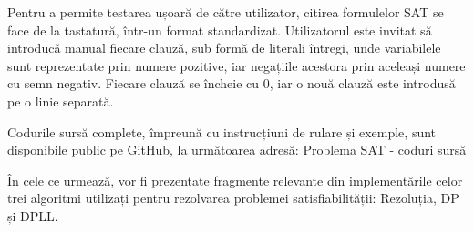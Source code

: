 \documentclass[12pt,a4paper]{article}
\begin{document}
Pentru a permite testarea ușoară de către utilizator, citirea formulelor SAT se face de la tastatură, într-un format standardizat. Utilizatorul este invitat să introducă manual fiecare clauză, sub formă de literali întregi, unde variabilele sunt reprezentate prin numere pozitive, iar negațiile acestora prin aceleași numere cu semn negativ. Fiecare clauză se încheie cu 0, iar o nouă clauză este introdusă pe o linie separată.

Codurile sursă complete, împreună cu instrucțiuni de rulare și exemple, sunt disponibile public pe GitHub, la următoarea adresă: \href{https://github.com/IsabellaNicorescu/SAT-solver}{Problema SAT - coduri sursă}


În cele ce urmează, vor fi prezentate fragmente relevante din implementările celor trei algoritmi utilizați pentru rezolvarea problemei satisfiabilității: Rezoluția, DP și DPLL.
\end{document}
